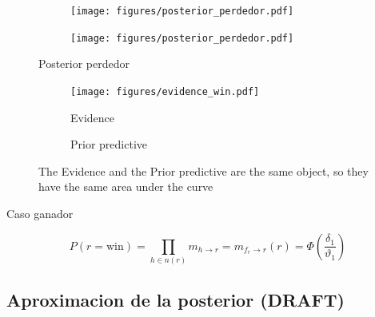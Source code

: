 \documentclass[article]{jss}
\begin{document}
\begin{appendix}
\begin{figure}[t!]
\centering
  \begin{subfigure}[t]{0.48\textwidth}
  \texttt{[image: figures/posterior\_perdedor.pdf]}
  \caption{}
  \label{posterior_perdedor_image}
  \end{subfigure}
  \begin{subfigure}[t]{0.48\textwidth}
  \texttt{[image: figures/posterior\_perdedor.pdf]}
  \caption{}
  \label{posterior_perdedor_distribution}
  \end{subfigure}
  \caption{Posterior perdedor}
  \label{posterior_perdedor}
\end{figure}

 \begin{figure}[t!]
\centering
  \begin{subfigure}[t]{0.48\textwidth}
  \texttt{[image: figures/evidence\_win.pdf]}
  \caption{Evidence}
  \label{fig:evidence_win}
  \end{subfigure}
  \begin{subfigure}[t]{0.48\textwidth}
  \caption{Prior predictive}
  \label{fig:prior_predictive_win}
  \end{subfigure}
  \caption{The Evidence and the Prior predictive are the same object, so they have the same area under the curve}
  \label{fig:evidence_prior_predictive}
\end{figure}

 Caso ganador

 \begin{equation}\label{eq:prior_predictive}
  P(r=\text{win}) = \prod_{h \in n(r)} m_{h \rightarrow r}  = m_{f_r \rightarrow r}(r) =  \Phi(\frac{\delta_1}{\vartheta_1})
 \end{equation}






























 \subsection{Aproximacion de la posterior (DRAFT)}


\end{appendix}
\end{document}
